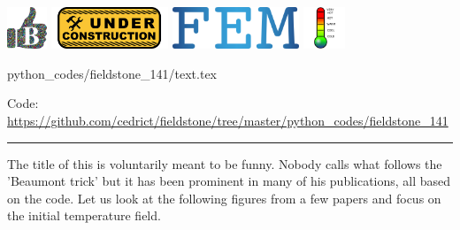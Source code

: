 \includegraphics[height=1.25cm]{images/pictograms/benchmark}
\includegraphics[height=1.25cm]{images/pictograms/under_construction}
\includegraphics[height=1.25cm]{images/pictograms/FEM}
\includegraphics[height=1.25cm]{images/pictograms/temperature}


\begin{flushright} {\tiny {\color{gray} python\_codes/fieldstone\_141/text.tex}} \end{flushright}



\begin{center}
Code: \url{https://github.com/cedrict/fieldstone/tree/master/python_codes/fieldstone_141}
\end{center}

\par\noindent\rule{\textwidth}{0.4pt}

The title of this \stone is voluntarily meant to be funny. 
Nobody calls what follows the 'Beaumont trick' but it has been 
prominent in many of his publications, all based on the \sopale code.
Let us look at the following figures from a few papers and focus on the 
initial temperature field.

